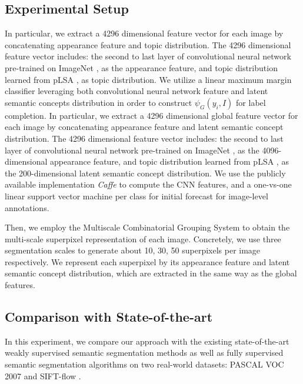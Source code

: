\subsection{Experimental Setup}
\if
In particular, we extract a 4296 dimensional feature vector for each image by concatenating appearance feature and topic distribution. The 4296 dimensional feature vector includes: the second to last layer of convolutional neural network \cite{simonyan2014very} pre-trained on ImageNet \cite{russakovsky2014imagenet}, as the appearance feature, and topic distribution learned from pLSA \cite{hofmann1999probabilistic}, as topic distribution.
\fi
We utilize a linear maximum margin classifier leveraging both convolutional neural network feature and latent semantic concepts distribution in order to construct $\psi_{G}(y_i,I)$ for label completion. In particular, we extract a 4296 dimensional global feature vector for each image by concatenating appearance feature and latent semantic concept distribution. The 4296 dimensional feature vector includes: the second to last layer of convolutional neural network \cite{simonyan2014very} pre-trained on ImageNet \cite{russakovsky2014imagenet}, as the 4096-dimensional appearance feature, and topic distribution learned from pLSA \cite{hofmann1999probabilistic}, as the 200-dimensional latent semantic concept distribution. We use the publicly available implementation \emph{Caffe} \cite{jia2014caffe} to compute the CNN features, and a one-vs-one linear support vector machine \cite{fan2008liblinear} per class for initial forecast for image-level annotations.

Then, we employ the Multiscale Combinatorial Grouping System \cite{arbelaez2014multiscale} to obtain the multi-scale superpixel representation of each image. Concretely, we use three segmentation scales to generate about 10, 30, 50 superpixels per image respectively. We represent each superpixel by its appearance feature and latent semantic concept distribution, which are extracted in the same way as the global features.

\subsection{Comparison with State-of-the-art}
In this experiment, we compare our approach with the existing state-of-the-art weakly supervised semantic segmentation methods as well as fully supervised semantic segmentation algorithms on two real-world datasets: PASCAL VOC 2007 \cite{pascal-voc-2007} and SIFT-flow \cite{liu2011nonparametric}.

